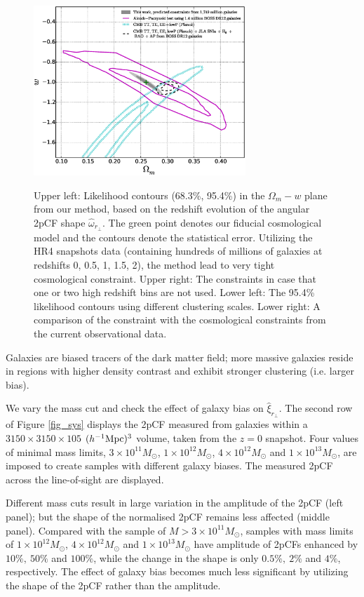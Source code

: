 \documentclass[iop]{emulateapj}
\begin{document}
\begin{figure}
{   \includegraphics[width=8cm]{fig9_d.eps}
   }
   \caption{\label{fig_contours}
   Upper left: Likelihood contours (68.3\%, 95.4\%) in the $\Omega_m-w$ plane from our method, 
   based on the redshift evolution of the angular 2pCF shape $\hat\omega_{r_\perp}$.
   The green point denotes our fiducial cosmological model and the contours denote the statistical error.
   Utilizing the HR4 snapshots data (containing hundreds of millions of galaxies at redshifts 0, 0.5, 1, 1.5, 2),
   the method lead to very tight cosmological constraint.
   Upper right: The constraints in case that one or two high redshift bins are not used.
   Lower left: The 95.4\% likelihood contours using different clustering scales.
   Lower right: A comparison of the constraint with the cosmological constraints from the current observational data.
   }
\end{figure}

Galaxies are biased tracers of the dark matter field;
more massive galaxies reside in regions with higher density contrast
and exhibit stronger clustering (i.e. larger bias).

We vary the mass cut and check the effect of galaxy bias on $\hat \xi_{r_\perp}$.
The second row of Figure \ref{fig_sys} displays the 2pCF measured from galaxies within a $3150\times3150\times105$ $(h^{-1}\rm Mpc)^3$ volume, taken from the $z=0$ snapshot.
Four values of minimal mass limits, $3\times 10^{11} M_{\odot}$, $1\times 10^{12} M_{\odot}$, $4\times 10^{12} M_{\odot}$ and $1\times 10^{13} M_{\odot}$,
are imposed to create samples with different galaxy biases.
The measured 2pCF across the line-of-sight are displayed.

Different mass cuts result in large variation in the amplitude of the 2pCF (left panel);
but the shape of the normalised 2pCF remains less affected (middle panel).
Compared with the sample of $M>3\times 10^{11} M_{\odot}$,
samples with mass limits of $1\times 10^{12} M_{\odot}$, $4\times 10^{12} M_{\odot}$ and $1\times 10^{13} M_{\odot}$
have amplitude of 2pCFs enhanced by $10\%,\ 50\%$ and $100\%$, 
while the change in the shape is only $0.5\%,\ 2\%$ and $4\%$, respectively.
The effect of galaxy bias becomes much less significant by utilizing the shape of the 2pCF rather than the amplitude.
\end{document}
